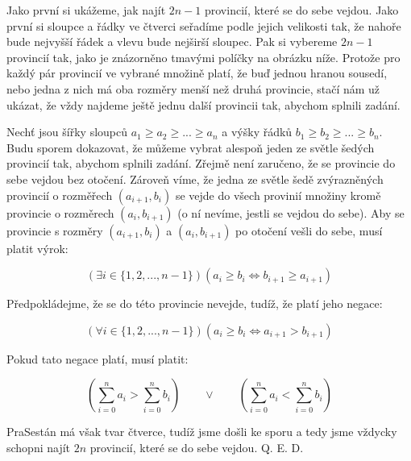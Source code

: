 \documentclass{fkssolpub}
\author{Ondřej Sedláček}
\begin{document}
 

Jako první si ukážeme, jak najít $2n - 1$ provincií, které se do sebe vejdou. Jako
první si sloupce a řádky ve čtverci seřadíme podle jejich velikosti tak, že nahoře
bude nejvyšší řádek a vlevu bude nejširší sloupec. Pak si vybereme $2n - 1$ provincií
tak, jako je znázorněno tmavými políčky na obrázku níže. Protože pro každý pár provincií 
ve vybrané
množině platí, že buď jednou hranou sousedí, nebo jedna z nich má oba rozměry menší než 
druhá provincie, stačí nám už ukázat, že vždy najdeme ještě jednu další provincii tak,
abychom splnili zadání.

Nechť jsou šířky sloupců $a_1 \geq a_2 \geq ... \geq a_n$ a výšky řádků $b_1 \geq b_2
\geq ... \geq b_n$. Budu sporem dokazovat, že můžeme vybrat alespoň jeden ze světle šedých 
provincií tak, abychom splnili zadání.
Zřejmě není zaručeno, že se provincie do sebe vejdou bez otočení. Zároveň
víme, že jedna ze světle šedě zvýrazněných provincií o rozměřech $(a_{i+1}, b_i)$ se
vejde do všech provinií množiny kromě provincie o rozměrech $(a_i, b_{i + 1})$ (o ní nevíme,
jestli se vejdou do sebe).
Aby se provincie s rozměry $(a_{i+1}, b_i)$ a $(a_i, b_{i + 1})$ po otočení vešli do sebe, 
musí platit výrok:

\[
  (\exists i \in \{1, 2, ..., n - 1\}) (a_i \geq b_i \Leftrightarrow b_{i + 1} \geq a_{i + 1})
\]

Předpokládejme, že se do této provincie nevejde, tudíž, že platí jeho negace:

\[
  (\forall i \in \{1, 2, ..., n - 1\}) (a_i \geq b_i \Leftrightarrow a_{i + 1} > b_{i + 1})
\]

Pokud tato negace platí, musí platit:

\[
  \left(\sum_{i=0}^{n} a_i > \sum_{i=0}^{n} b_i \right) \qquad \lor \qquad \left( \sum_{i=0}^{n} a_i < \sum_{i=0}^{n} b_i \right)
\]

PraSestán má však tvar čtverce, tudíž jsme došli ke sporu a tedy jsme vždycky schopni
najít $2n$ provincií, které se do sebe vejdou. Q. E. D.
\end{document}
